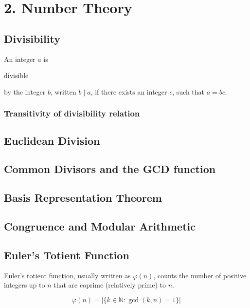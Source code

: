 \documentclass[11pt]{article}
\theoremstyle{plain}
\theoremstyle{definition}
\begin{document}
\section*{2. Number Theory}

\subsection*{Divisibility}

An integer $a$ is \begin{em}divisible\end{em} by the integer $b$, written $b \mid a$, if there exists an integer $c$, such that $ a = bc. $

\subsubsection*{Transitivity of divisibility relation}

\subsection*{Euclidean Division}

\subsection*{Common Divisors and the GCD function}

\subsection*{Basis Representation Theorem}

\subsection*{Congruence and Modular Arithmetic}

\subsection*{Euler's Totient Function}

Euler's totient function, usually written as $\varphi(n)$, counts the number of positive integers up to $n$ that are coprime (relatively prime) to $n$.

$$ \varphi(n) = |\{k \in \mathbb{N} : \gcd(k, n) = 1\}| $$
\end{document}
